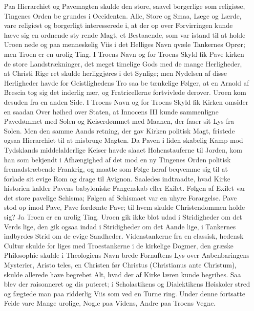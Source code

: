 \documentclass[12pt]{book}
\newcommand{\opage}[1]{\marginnote{\footnotesize\textit{[#1]}}}
\begin{document}
Paa Hierarchiet og Pavemagten skulde den store,
saavel borgerlige som religiøse, Tingenes Orden be\-%
grundes i Occidenten. Alle, Store og Smaa, Læge og
Lærde, vare religiøst og borgerligt interesserede i, at der
op over Forvirringen kunde hæve sig en ordnende sty\-%
rende Magt, et Bestaaende, som var istand til at holde
Uroen nede og paa menneskelig Viis i det Helliges Navn
qvæle Tankernes Oprør; men Troen er en urolig
Ting. I Troens Navn og for Troens Skyld fik Pave\-%
kirken de store Landstrækninger, det meget timelige
Gods med de mange Herligheder, at Christi Rige ret
skulde herliggjøres i det Synlige; men Nydelsen af
disse Herligheder havde for Geistlighedens Tro saa be\-%
tænkelige Følger, at en Arnold af Brescia tog sig det
inderlig nær, og Fratricellerne fortvivlede derover. Uroen
kom desuden fra en anden Side. I Troens Navn og
for Troens Skyld fik Kirken omsider en saadan Over\-%
høihed over Staten, at Innocens III kunde sammenligne
Pavedømmet med Solen og Keiserdømmet med Maanen,
der faaer sit Lys fra Solen. Men den samme Aands\-%
retning, der gav Kirken politisk Magt, fristede ogsaa
Hierarchiet til at misbruge Magten. Da Paven i liden\-%
skabelig Kamp mod Tydsklands middelalderlige Keiser
\opage{263}\setcounter{footnote}{0}%
havde slaaet Hohenstauferne til Jorden, kom han som
bekjendt i Afhængighed af det mod en ny Tingenes
Orden politisk fremadstræbende Frankrig, og maatte
som Følge heraf beqvemme sig til at forlade sit evige Rom
og drage til Avignon. Saaledes indtraadte, hvad Kirke\-%
historien kalder Pavens babyloniske Fangenskab eller
Exilet. Følgen af Exilet var det store pavelige Schisma;
Følgen af Schismaet var en uhyre Forargelse. Pave stod
op imod Pave, Pave fordømte Pave; til hvem skulde
Christendommen holde sig? Ja Troen er en urolig Ting.
Uroen gik ikke blot udad i Stridigheder om det Verds\-%
lige, den gik ogsaa indad i Stridigheder om det Aande\-%
lige, i Tankernes indbyrdes Strid om de evige Sandheder.
Videnstankerne fra en classisk, hedensk Cultur skulde for\-%
liges med Troestankerne i de kirkelige Dogmer, den
græske Philosophie skulde i Theologiens Navn brede
Fornuftens Lys over Aabenbaringens Mysterier, Aristo\-%
teles, en Christen før Christus (Christianus ante Christum),
skulde allerede have begrebet Alt, hvad der af Kirke\-%
læren kunde begribes. Saa blev der raisonneret og dis\-%
puteret; i Scholastikens og Dialektikens Høiskoler stred
og fægtede man paa ridderlig Viis som ved en Turne\-%
ring. Under denne fortsatte Feide vare Mange urolige,
Nogle paa Videns, Andre paa Troens Vegne.
\end{document}
